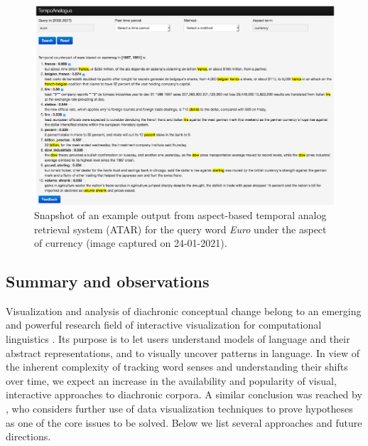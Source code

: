 \documentclass[output=paper%
]{langsci/langscibook}
\begin{document}
\begin{figure}
	\includegraphics[width=\textwidth]{figures/JATOWT_WSDM.png}
    \caption{Snapshot of an example output from aspect-based temporal analog retrieval system (ATAR) for the query word \emph{Euro} under the aspect of currency (image captured on 24-01-2021).\label{fig:wsdm}}
\end{figure}


\subsection{Summary and observations}
Visualization and analysis of diachronic conceptual change belong to an emerging and powerful research field of interactive visualization for computational linguistics \citep{collins2008interactive}. Its purpose is to let users understand models of language and their abstract representations, and to visually uncover patterns in language. In view of the inherent complexity of tracking word senses and understanding their shifts over time, we expect an increase in the availability and popularity of visual, interactive approaches to diachronic corpora. 
A similar conclusion was reached by \citet{tang-2018}, who considers further use of data visualization techniques to prove hypotheses  as one of the core issues to be solved. Below we list several approaches and future directions.
\end{document}
